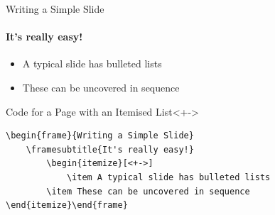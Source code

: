 \begin{frame}[fragile]{Writing a Simple Slide}
\framesubtitle{It's really easy!}
\begin{itemize}[<+-| uncover@1-2>]
    \item A typical slide has bulleted lists
    \item These can be uncovered in sequence
\end{itemize}
\begin{block}{Code for a Page with an Itemised List}<+->
\begin{verbatim}
\begin{frame}{Writing a Simple Slide}
    \framesubtitle{It's really easy!}
        \begin{itemize}[<+->]
            \item A typical slide has bulleted lists
        \item These can be uncovered in sequence
\end{itemize}\end{frame}
\end{verbatim}
\end{block}
\end{frame}


